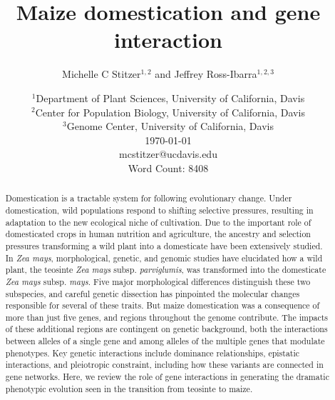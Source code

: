 \documentclass[a4paper]{article}
\title{Maize domestication and gene interaction}
\author{Michelle C Stitzer$^{1,2}$ and Jeffrey Ross-Ibarra$^{1,2,3}$}
\date{\small$^1$Department of Plant Sciences, University of California, Davis\\
$^2$Center for Population Biology, University of California, Davis\\
$^3$Genome Center, University of California, Davis\\
\today\\
mcstitzer@ucdavis.edu\\
Word Count: 8408}
\begin{document}
\maketitle




﻿\begin{abstract}
﻿Domestication is a tractable system for following evolutionary change.
Under domestication, wild populations respond to shifting selective pressures, resulting in adaptation to the new ecological niche of cultivation.
Due to the important role of domesticated crops in human nutrition and agriculture, the ancestry and selection pressures transforming a wild plant into a domesticate have been extensively studied.
In \textit{Zea mays}, morphological, genetic, and genomic studies have elucidated how a wild plant, the teosinte \textit{Zea mays} subsp. \textit{parviglumis}, was transformed into the domesticate \textit{Zea mays} subsp. \textit{mays}.
Five major morphological differences distinguish these two subspecies, and careful genetic dissection  has pinpointed the molecular changes responsible for several of these traits.
But maize domestication was a consequence of more than just five genes, and regions throughout the genome contribute.
The impacts of these additional regions are contingent on genetic background, both the interactions between alleles of a single gene and among alleles of the multiple genes that modulate phenotypes.
Key genetic interactions include dominance relationships, epistatic interactions, and pleiotropic constraint, including how these variants are connected in gene networks.
Here, we review the role of gene interactions in generating the dramatic phenotypic evolution seen in the transition from teosinte to maize.
\end{abstract}
\end{document}
